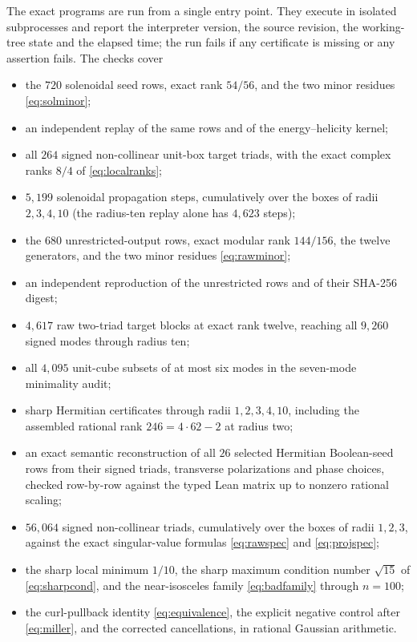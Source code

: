 \documentclass[11pt]{article}
\theoremstyle{definition}
\theoremstyle{remark}
\theoremstyle{plain}
\begin{document}
The exact programs are run from a single entry point. They execute in isolated
subprocesses and report the interpreter version, the source revision, the
working-tree state and the elapsed time; the run fails if any certificate is
missing or any assertion fails. The checks cover
\begin{itemize}
\item the $720$ solenoidal seed rows, exact rank $54/56$, and the two minor
residues \eqref{eq:solminor};
\item an independent replay of the same rows and of the energy--helicity
kernel;
\item all $264$ signed non-collinear unit-box target triads, with the exact
complex ranks $8/4$ of \eqref{eq:localranks};
\item $5{,}199$ solenoidal propagation steps, cumulatively over the boxes of
radii $2,3,4,10$ (the radius-ten replay alone has $4{,}623$ steps);
\item the $680$ unrestricted-output rows, exact modular rank $144/156$, the
twelve generators, and the two minor residues \eqref{eq:rawminor};
\item an independent reproduction of the unrestricted rows and of their
SHA-256 digest;
\item $4{,}617$ raw two-triad target blocks at exact rank twelve, reaching all
$9{,}260$ signed modes through radius ten;
\item all $4{,}095$ unit-cube subsets of at most six modes in the seven-mode
minimality audit;
\item sharp Hermitian certificates through radii $1,2,3,4,10$, including the
assembled rational rank $246=4\cdot62-2$ at radius two;
\item an exact semantic reconstruction of all $26$ selected Hermitian
Boolean-seed rows from their signed triads, transverse polarizations and phase
choices, checked row-by-row against the typed Lean matrix up to nonzero
rational scaling;
\item $56{,}064$ signed non-collinear triads, cumulatively over the boxes of
radii $1,2,3$, against the exact singular-value formulas
\eqref{eq:rawspec} and \eqref{eq:projspec};
\item the sharp local minimum $1/10$, the sharp maximum condition number
$\sqrt{15}$ of \eqref{eq:sharpcond}, and the near-isosceles family
\eqref{eq:badfamily} through $n=100$;
\item the curl-pullback identity \eqref{eq:equivalence}, the explicit negative
control after \eqref{eq:miller}, and the corrected cancellations, in rational
Gaussian arithmetic.
\end{itemize}
\end{document}
